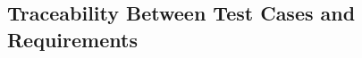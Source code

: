 \documentclass[12pt, titlepage]{article}
\begin{document}

    					
    					
    					
    					




    					
    					
    					
    					

\subsection{Traceability Between Test Cases and Requirements}
\end{document}

